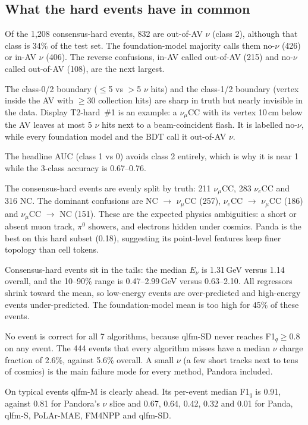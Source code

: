 \documentclass[11pt,a4paper]{article}
\newcommand{\nue}{\ensuremath{\nu_e}}
\newcommand{\numu}{\ensuremath{\nu_\mu}}
\begin{document}
\subsection{What the hard events have in common}
\begin{description}[leftmargin=1.2em]
\item[T2.] Of the 1{,}208 consensus-hard events, 832 are out-of-AV $\nu$ (class 2), although that class is 34\% of the test set. The foundation-model majority calls them no-$\nu$ (426) or in-AV $\nu$ (406). The reverse confusions, in-AV called out-of-AV (215) and no-$\nu$ called out-of-AV (108), are the next largest.

  The class-0/2 boundary ($\leq$5 vs $>$5 $\nu$ hits) and the class-1/2 boundary (vertex inside the AV with $\geq$30 collection hits) are sharp in truth but nearly invisible in the data. Display T2-hard~\#1 is an example: a \numu CC with its vertex 10\,cm below the AV leaves at most 5 $\nu$ hits next to a beam-coincident flash. It is labelled no-$\nu$, while every foundation model and the BDT call it out-of-AV $\nu$.

  The headline AUC (class 1 vs 0) avoids class 2 entirely, which is why it is near 1 while the 3-class accuracy is 0.67--0.76.
\item[T3.] The consensus-hard events are evenly split by truth: 211 \numu CC, 283 \nue CC and 316 NC. The dominant confusions are NC $\to$ \numu CC (257), \nue CC $\to$ \numu CC (186) and \numu CC $\to$ NC (151). These are the expected physics ambiguities: a short or absent muon track, $\pi^0$ showers, and electrons hidden under cosmics. Panda is the best on this hard subset (0.18), suggesting its point-level features keep finer topology than cell tokens.
\item[T4.] Consensus-hard events sit in the tails: the median $E_\nu$ is 1.31\,GeV versus 1.14 overall, and the 10--90\% range is 0.47--2.99\,GeV versus 0.63--2.10. All regressors shrink toward the mean, so low-energy events are over-predicted and high-energy events under-predicted. The foundation-model mean is too high for 45\% of these events.
\item[T1.] No event is correct for all 7 algorithms, because qlfm-SD never reaches F1$_q\geq0.8$ on any event. The 444 events that every algorithm misses have a median $\nu$ charge fraction of 2.6\%, against 5.6\% overall. A small $\nu$ (a few short tracks next to tens of cosmics) is the main failure mode for every method, Pandora included.

  On typical events qlfm-M is clearly ahead. Its per-event median F1$_q$ is 0.91, against 0.81 for Pandora's $\nu$ slice and 0.67, 0.64, 0.42, 0.32 and 0.01 for Panda, qlfm-S, PoLAr-MAE, FM4NPP and qlfm-SD.
\end{description}
\end{document}
